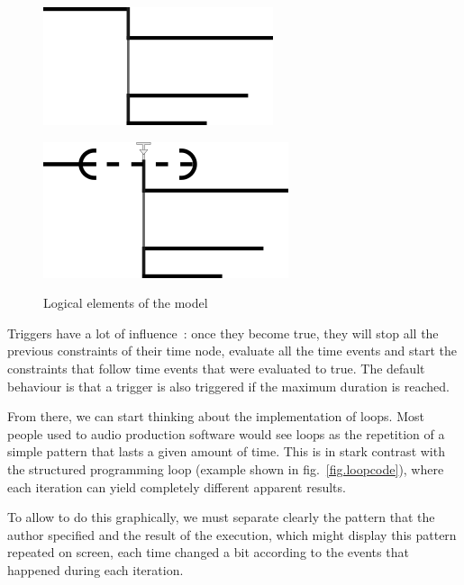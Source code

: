 \documentclass{sigchi}
\begin{document}
\begin{figure}[h]
	\centering
	\begin{minipage}[b]{.5\linewidth}
		\centering
		\includegraphics[scale=0.7]{images/events.png}
		\label{fig.logical.events}
	\end{minipage}\begin{minipage}[b]{.5\linewidth}
	\centering
	\includegraphics[scale=0.7]{images/trigger.png}
	\label{fig.logical.trigger}
    \end{minipage}	

\caption{Logical elements of the model}
\label{fig.logical}
\end{figure}	

Triggers have a lot of influence~: once they become true, they will stop all the previous constraints of their time node, evaluate all the time events and start the constraints that follow time events that were evaluated to true. The default behaviour is that a trigger is also triggered if the maximum duration is reached.

From there, we can start thinking about the implementation of loops. Most people used to audio production software would see loops as the repetition of a simple pattern that lasts a given amount of time. This is in stark contrast with the structured programming loop (example shown in fig.~\ref{fig.loopcode}), where each iteration can yield completely different apparent results.

To allow to do this graphically, we must separate clearly the pattern that the author specified and the result of the execution, which might display this pattern repeated on screen, each time changed a bit according to the events that happened during each iteration.
\end{document}
